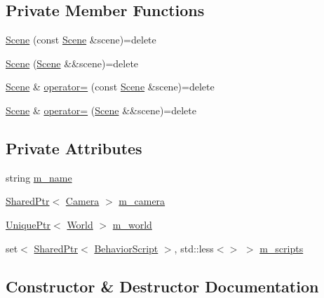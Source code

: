 \subsection*{Private Member Functions}
\begin{DoxyCompactItemize}
\item 
\hyperlink{classmage_1_1_scene_a88d83ccb2e10549d5370f850b2b4c228}{Scene} (const \hyperlink{classmage_1_1_scene}{Scene} \&scene)=delete
\item 
\hyperlink{classmage_1_1_scene_a084284387b472f4eaf421509ef267b34}{Scene} (\hyperlink{classmage_1_1_scene}{Scene} \&\&scene)=delete
\item 
\hyperlink{classmage_1_1_scene}{Scene} \& \hyperlink{classmage_1_1_scene_a2c25c0fedc0230771d8c00a8288a69ce}{operator=} (const \hyperlink{classmage_1_1_scene}{Scene} \&scene)=delete
\item 
\hyperlink{classmage_1_1_scene}{Scene} \& \hyperlink{classmage_1_1_scene_a400926762670c9cd9b6d456291600f53}{operator=} (\hyperlink{classmage_1_1_scene}{Scene} \&\&scene)=delete
\end{DoxyCompactItemize}
\subsection*{Private Attributes}
\begin{DoxyCompactItemize}
\item 
string \hyperlink{classmage_1_1_scene_a6cc8cb08b1853c4e3063b33a94e8fb47}{m\+\_\+name}
\item 
\hyperlink{namespacemage_a1e01ae66713838a7a67d30e44c67703e}{Shared\+Ptr}$<$ \hyperlink{classmage_1_1_camera}{Camera} $>$ \hyperlink{classmage_1_1_scene_a961c280659f9934441d8e835508e933d}{m\+\_\+camera}
\item 
\hyperlink{namespacemage_a8c307fbcc33bce9b7f2aa4c26c3b95cf}{Unique\+Ptr}$<$ \hyperlink{classmage_1_1_world}{World} $>$ \hyperlink{classmage_1_1_scene_a0d06149d881166497bf75ae2288bf960}{m\+\_\+world}
\item 
set$<$ \hyperlink{namespacemage_a1e01ae66713838a7a67d30e44c67703e}{Shared\+Ptr}$<$ \hyperlink{classmage_1_1_behavior_script}{Behavior\+Script} $>$, std\+::less$<$$>$ $>$ \hyperlink{classmage_1_1_scene_a74ad0b8c6b085bd519de33da51ebb8dd}{m\+\_\+scripts}
\end{DoxyCompactItemize}


\subsection{Constructor \& Destructor Documentation}
\hypertarget{classmage_1_1_scene_a6b97d0181285a69bd0a9789f534abc43}{}\label{classmage_1_1_scene_a6b97d0181285a69bd0a9789f534abc43} 
